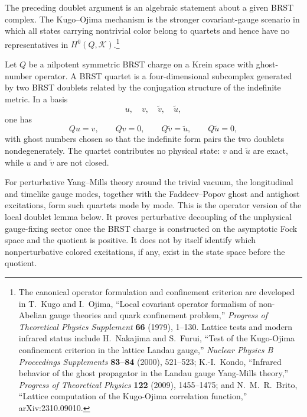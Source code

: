The preceding doublet argument is an algebraic statement about a given
BRST complex.  The Kugo--Ojima mechanism is the stronger covariant-gauge
scenario in which all states carrying nontrivial color belong to quartets
and hence have no representatives in \(H^0(Q,\mathcal K)\).\footnote{The
canonical operator formulation and confinement criterion are developed in
T.~Kugo and I.~Ojima, ``Local covariant operator formalism of non-Abelian
gauge theories and quark confinement problem,'' \emph{Progress of Theoretical
Physics Supplement} \textbf{66} (1979), 1--130.  Lattice tests and modern
infrared status include H.~Nakajima and S.~Furui, ``Test of the Kugo-Ojima
confinement criterion in the lattice Landau gauge,'' \emph{Nuclear Physics B
Proceedings Supplements} \textbf{83--84} (2000), 521--523; K.-I.~Kondo,
``Infrared behavior of the ghost propagator in the Landau gauge Yang-Mills
theory,'' \emph{Progress of Theoretical Physics} \textbf{122} (2009),
1455--1475; and N.~M.~R.~Brito, ``Lattice computation of the Kugo-Ojima
correlation function,'' arXiv:2310.09010.}

\begin{definition}
Let \(Q\) be a nilpotent symmetric BRST charge on a Krein space with
ghost-number operator.  A BRST quartet is a four-dimensional
subcomplex generated by two BRST doublets related by the conjugation structure
of the indefinite metric.  In a basis
\[
  u,\quad v,\quad \widetilde v,\quad \widetilde u ,
\]
one has
\[
  Q u=v,\qquad Qv=0,\qquad
  Q\widetilde v=\widetilde u,\qquad Q\widetilde u=0,
\]
with ghost numbers chosen so that the indefinite form pairs the two doublets
nondegenerately.  The quartet contributes no physical state: \(v\) and
\(\widetilde u\) are exact, while \(u\) and \(\widetilde v\) are not closed.
\end{definition}

For perturbative Yang--Mills theory around the trivial vacuum, the longitudinal
and timelike gauge modes, together with the Faddeev--Popov ghost and antighost
excitations, form such quartets mode by mode.  This is the operator version of
the local doublet lemma below.  It proves perturbative decoupling of the
unphysical gauge-fixing sector once the BRST charge is constructed on the
asymptotic Fock space and the quotient is positive.  It does not by itself
identify which nonperturbative colored excitations, if any, exist in the
state space before the quotient.

